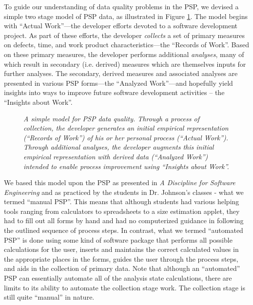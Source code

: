To guide our understanding of data quality problems in the PSP, we devised
a simple two stage model of PSP data, as illustrated in Figure
\ref{fig:model}.  The model begins with ``Actual Work''---the developer
efforts devoted to a software development project.  As part of these
efforts, the developer {\em collects} a set of primary measures on defects,
time, and work product characteristics---the ``Records of Work''. Based on
these primary measures, the developer performs additional {\em analyses},
many of which result in secondary (i.e.  derived) measures which are
themselves inputs for further analyses.  The secondary, derived measures
and associated analyses are presented in various PSP forms---the ``Analyzed
Work''---and hopefully yield insights into ways to improve future
software development activities -- the ``Insights about Work''.

\begin{figure}[h] 
    {\centerline{}}
    \caption[A Simple Model for PSP Data Quality]{\label{fig:model} 
      {\em A simple model for PSP data quality. Through 
      a process of {\em collection}, the developer generates an initial
      empirical representation (``Records of Work'') of his or her personal
      process (``Actual Work'').  Through additional {\em analyses}, the developer
      augments this initial empirical representation with derived data
      (``Analyzed Work'') intended to enable process improvement using
      ``Insights about Work''.}}
\end{figure}

We based this model upon the PSP as presented in {\it A Discipline for
  Software Engineering} \cite{Humphrey95} and as practiced by the students
in Dr. Johnson's classes - what we termed ``manual PSP''.  This means that
although students had various helping tools ranging from calculators to
spreadsheets to a size estimation applet, they had to fill out all forms by
hand and had no computerized guidance in following the outlined sequence of
process steps.  In contrast, what we termed ``automated PSP'' is done using
some kind of software package that performs all possible calculations for
the user, inserts and maintains the correct calculated values in the
appropriate places in the forms, guides the user through the process steps,
and aids in the collection of primary data. Note that although an
``automated'' PSP can essentially automate all of the analysis state
calculations, there are limits to its ability to automate the collection
stage work.  The collection stage is still quite ``manual'' in nature.


